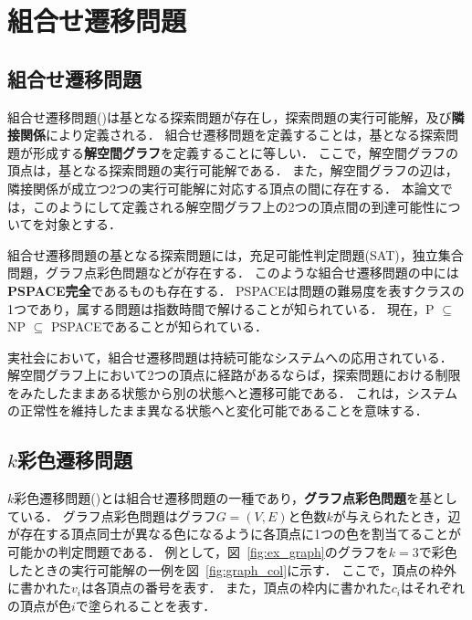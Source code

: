 \chapter{組合せ遷移問題} \label{chap:background}

\section{組合せ遷移問題}
組合せ遷移問題(\cite{Ito18:tohoku})は基となる探索問題が存在し，探索問題の実行可能解，及び\textbf{隣接関係}により定義される．
組合せ遷移問題を定義することは，基となる探索問題が形成する\textbf{解空間グラフ}を定義することに等しい．
ここで，解空間グラフの頂点は，基となる探索問題の実行可能解である． 
また，解空間グラフの辺は，隣接関係が成立つ2つの実行可能解に対応する頂点の間に存在する．
本論文では，このようにして定義される解空間グラフ上の2つの頂点間の到達可能性についてを対象とする．

組合せ遷移問題の基となる探索問題には，充足可能性判定問題(SAT)，独立集合問題，グラフ点彩色問題などが存在する．
このような組合せ遷移問題の中には\textbf{PSPACE完全}であるものも存在する． 
PSPACEは問題の難易度を表すクラスの1つであり，属する問題は指数時間で解けることが知られている． 
現在，P $\subseteq$ NP $\subseteq$ PSPACEであることが知られている．

実社会において，組合せ遷移問題は持続可能なシステムへの応用されている． 
解空間グラフ上において2つの頂点に経路があるならば，探索問題における制限をみたしたままある状態から別の状態へと遷移可能である． 
これは，システムの正常性を維持したまま異なる状態へと変化可能であることを意味する．

\section{$k$彩色遷移問題}
$k$彩色遷移問題(\cite{BC2009:tcs})とは組合せ遷移問題の一種であり，\textbf{グラフ点彩色問題}を基としている． 
グラフ点彩色問題はグラフ$G=(V, E)$と色数$k$が与えられたとき，辺が存在する頂点同士が異なる色になるように各頂点に1つの色を割当てることが可能かの判定問題である． 
例として，図~\ref{fig:ex_graph}のグラフを$k=3$で彩色したときの実行可能解の一例を図~\ref{fig:graph_col}に示す． 
ここで，頂点の枠外に書かれた$v_i$は各頂点の番号を表す．
また，頂点の枠内に書かれた$c_i$はそれぞれの頂点が色$i$で塗られることを表す．

